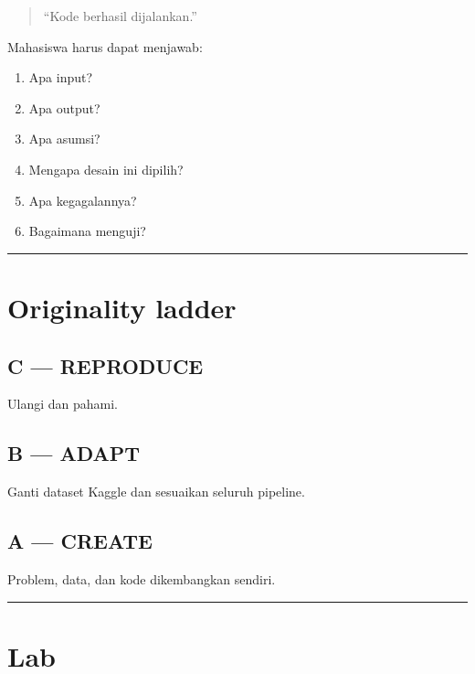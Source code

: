 \documentclass[
  indonesian,
  letterpaper,
  DIV=11,
  numbers=noendperiod]{scrreprt}
\providecommand{\tightlist}{%
  \setlength{\itemsep}{0pt}\setlength{\parskip}{0pt}}
\begin{document}
\begin{quote}
``Kode berhasil dijalankan.''
\end{quote}

Mahasiswa harus dapat menjawab:

\begin{enumerate}
\def\labelenumi{\arabic{enumi}.}
\tightlist
\item
  Apa input?
\item
  Apa output?
\item
  Apa asumsi?
\item
  Mengapa desain ini dipilih?
\item
  Apa kegagalannya?
\item
  Bagaimana menguji?
\end{enumerate}

\begin{center}\rule{0.5\linewidth}{0.5pt}\end{center}

\section{Originality ladder}\label{originality-ladder}

\subsection{C --- REPRODUCE}\label{c-reproduce}

Ulangi dan pahami.

\subsection{B --- ADAPT}\label{b-adapt}

Ganti dataset Kaggle dan sesuaikan seluruh pipeline.

\subsection{A --- CREATE}\label{a-create}

Problem, data, dan kode dikembangkan sendiri.

\begin{center}\rule{0.5\linewidth}{0.5pt}\end{center}

\section{Lab}\label{lab}
\end{document}

